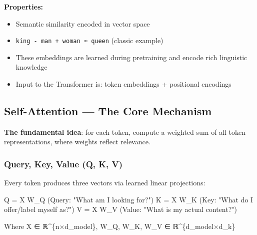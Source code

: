 \documentclass[11pt]{article}
\providecommand{\tightlist}{\setlength{\itemsep}{1pt}\setlength{\parskip}{0pt}}
\newenvironment{Shaded}{\begin{snugshade}}{\end{snugshade}}
\newcommand{\NormalTok}[1]{\textcolor[rgb]{0.81,0.81,0.76}{#1}}
\newcommand{\OperatorTok}[1]{\textcolor[rgb]{0.81,0.81,0.76}{#1}}
\newcommand{\StringTok}[1]{\textcolor[rgb]{0.96,0.31,0.31}{#1}}
\begin{document}
\textbf{Properties:}

\begin{itemize}
\tightlist
\item
  Semantic similarity encoded in vector space
\item
  \texttt{king\ -\ man\ +\ woman\ ≈\ queen} (classic example)
\item
  These embeddings are learned during pretraining and encode rich linguistic knowledge
\item
  Input to the Transformer is: token embeddings + positional encodings
\end{itemize}

\subsection{Self-Attention --- The Core Mechanism}\label{self-attention--the-core-mechanism}


\textbf{The fundamental idea}: for each token, compute a weighted sum of all token representations, where weights reflect relevance.

\subsubsection{Query, Key, Value (Q, K, V)}\label{query-key-value-q-k-v}

Every token produces three vectors via learned linear projections:


\begin{Shaded}
\begin{Highlighting}[]
\NormalTok{Q }\OperatorTok{=}\NormalTok{ X W\_Q    (Query:  }\StringTok{"What am I looking for?"}\NormalTok{)}
\NormalTok{K }\OperatorTok{=}\NormalTok{ X W\_K    (Key:    }\StringTok{"What do I offer/label myself as?"}\NormalTok{)}
\NormalTok{V }\OperatorTok{=}\NormalTok{ X W\_V    (Value:  }\StringTok{"What is my actual content?"}\NormalTok{)}

\NormalTok{Where X ∈ ℝ}\OperatorTok{\^{}}\NormalTok{\{n×d\_model\}, W\_Q, W\_K, W\_V ∈ ℝ}\OperatorTok{\^{}}\NormalTok{\{d\_model×d\_k\}}
\end{Highlighting}
\end{Shaded}
\end{document}
